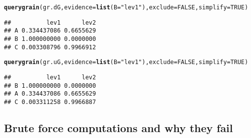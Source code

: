 \documentclass[10pt]{article}\usepackage[]{graphicx}\usepackage[]{xcolor}
\makeatletter
\newcommand{\hlnum}[1]{\textcolor[rgb]{0.686,0.059,0.569}{#1}}%
\newcommand{\hlstr}[1]{\textcolor[rgb]{0.192,0.494,0.8}{#1}}%
\newcommand{\hlstd}[1]{\textcolor[rgb]{0.345,0.345,0.345}{#1}}%
\newcommand{\hlkwc}[1]{\textcolor[rgb]{0.333,0.667,0.333}{#1}}%
\newcommand{\hlkwd}[1]{\textcolor[rgb]{0.737,0.353,0.396}{\textbf{#1}}}%
\newenvironment{kframe}{%
 \def\at@end@of@kframe{}%
 \ifinner\ifhmode%
  \def\at@end@of@kframe{\end{minipage}}%
  \begin{minipage}{\columnwidth}%
 \fi\fi%
 \def\FrameCommand##1{\hskip\@totalleftmargin \hskip-\fboxsep
 \colorbox{shadecolor}{##1}\hskip-\fboxsep
     \hskip-\linewidth \hskip-\@totalleftmargin \hskip\columnwidth}%
 \MakeFramed {\advance\hsize-\width
   \@totalleftmargin\z@ \linewidth\hsize
   \@setminipage}}%
 {\par\unskip\endMakeFramed%
 \at@end@of@kframe}
\newenvironment{knitrout}{}{} %
\makeatother
\begin{document}
\begin{knitrout}
\color{fgcolor}\begin{kframe}
\begin{alltt}
\hlkwd{querygrain}\hlstd{(gr.dG,} \hlkwc{evidence}\hlstd{=}\hlkwd{list}\hlstd{(}\hlkwc{B}\hlstd{=}\hlstr{"lev1"}\hlstd{),} \hlkwc{exclude}\hlstd{=}\hlnum{FALSE}\hlstd{,} \hlkwc{simplify}\hlstd{=}\hlnum{TRUE}\hlstd{)}
\end{alltt}
\begin{verbatim}
##          lev1      lev2
## A 0.334437086 0.6655629
## B 1.000000000 0.0000000
## C 0.003308796 0.9966912
\end{verbatim}
\begin{alltt}
\hlkwd{querygrain}\hlstd{(gr.uG,} \hlkwc{evidence}\hlstd{=}\hlkwd{list}\hlstd{(}\hlkwc{B}\hlstd{=}\hlstr{"lev1"}\hlstd{),} \hlkwc{exclude}\hlstd{=}\hlnum{FALSE}\hlstd{,} \hlkwc{simplify}\hlstd{=}\hlnum{TRUE}\hlstd{)}
\end{alltt}
\begin{verbatim}
##          lev1      lev2
## B 1.000000000 0.0000000
## A 0.334437086 0.6655629
## C 0.003311258 0.9966887
\end{verbatim}
\end{kframe}
\end{knitrout}




\subsection{Brute force computations and why they fail}
\label{sec:brute-force-comp}
\end{document}
